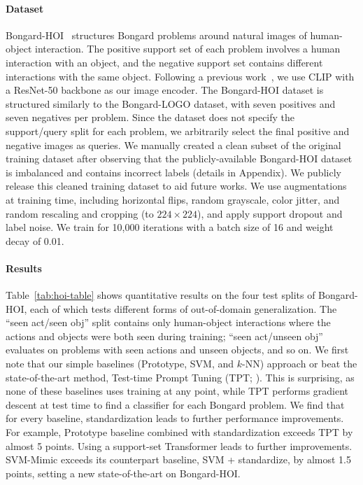 \paragraph{Dataset}
Bongard-HOI~\cite{jiang2023bongardhoi} structures Bongard problems around natural images of human-object
interaction. The positive support set of each problem involves a human interaction with an object, and the negative support set contains different interactions with the same object. Following a previous work~\cite{shu2022testtime}, we use CLIP with a ResNet-50 backbone as our image encoder. The Bongard-HOI dataset is structured similarly to the Bongard-LOGO dataset, with seven positives and seven negatives per problem. Since the dataset does not specify the support/query split for each problem, we arbitrarily select the final positive and negative images as queries. 
We manually created a clean subset of the original training dataset after observing that the publicly-available Bongard-HOI dataset is imbalanced and contains incorrect labels (details in Appendix). We publicly release this cleaned training dataset to aid future works. We use augmentations at training time, including horizontal flips, random grayscale, color jitter, and random rescaling and cropping (to $224 \times 224$), and apply support dropout and label noise.
We train for 10,000 iterations with a batch size of 16 and weight decay of 0.01.

\paragraph{Results}

Table~\ref{tab:hoi-table} shows quantitative results on the four test splits of Bongard-HOI, each of which tests different forms of out-of-domain generalization. The ``seen act/seen obj'' split contains only human-object interactions where the actions and objects were both seen during training; ``seen act/unseen obj'' evaluates on problems with seen actions and unseen objects, and so on. We first note that our simple baselines (Prototype, SVM, and $k$-NN) approach or beat the state-of-the-art method, Test-time Prompt Tuning (TPT; \citet{shu2022testtime}). This is surprising, as none of these baselines uses training at any point, while TPT performs gradient descent at test time to find a classifier for each Bongard problem. We find that for every baseline, standardization leads to further performance improvements. For example, Prototype baseline combined with standardization exceeds TPT by almost 5 points.
Using a support-set Transformer leads to further improvements. SVM-Mimic exceeds its counterpart baseline, SVM + standardize, by almost 1.5 points, setting a new state-of-the-art on Bongard-HOI.

